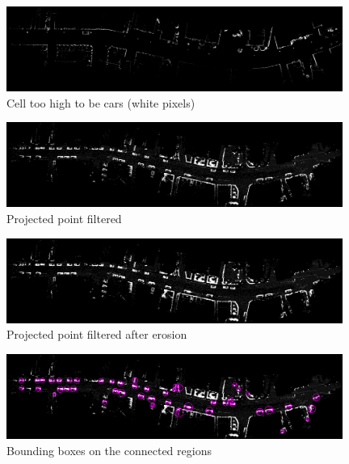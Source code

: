 \begin{figure}[tp]
 \centering
 \includegraphics[width=0.98\textwidth]{./img/ch-laser/heightimagePointsProjected_.png}
 \caption{Cell too high to be cars (white pixels)}
 \label{fig:heightfiltering}
\end{figure}

\begin{figure}[tp]
 \centering
 \includegraphics[width=0.98\textwidth]{./img/ch-laser/pointsprojectedFiltered.png}
 \caption{Projected point filtered}
 \label{fig:pointsprojectedFiltered}
\end{figure}

\begin{figure}[tp]
 \centering
 \includegraphics[width=0.98\textwidth]{./img/ch-laser/pointsprojectedEroded.png}
 \caption{Projected point filtered after erosion}
 \label{fig:pointsprojectedEroded}
\end{figure}

\begin{figure}[tp]
 \centering
 \includegraphics[width=0.98\textwidth]{./img/ch-laser/pointsprojectedErodedWithBoundingBoxes.png}
 \caption{Bounding boxes on the connected regions}
 \label{fig:pointsprojectedErodedWithBoundingBoxes}
\end{figure}

